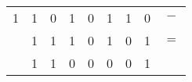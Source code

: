 \documentclass{standalone}
\begin{document}
\begin{tabular}{ cccccccc|c }
	1 & 1 & 0 & 1 & 0 & 1 & 1 & 0 & \(-\)\\
	& 1 & 1 & 1 & 0 & 1 & 0 & 1 & \(=\)\\\hline
	& 1 & 1 & 0 & 0 & 0 & 0 & 1 &
\end{tabular}
\end{document}
